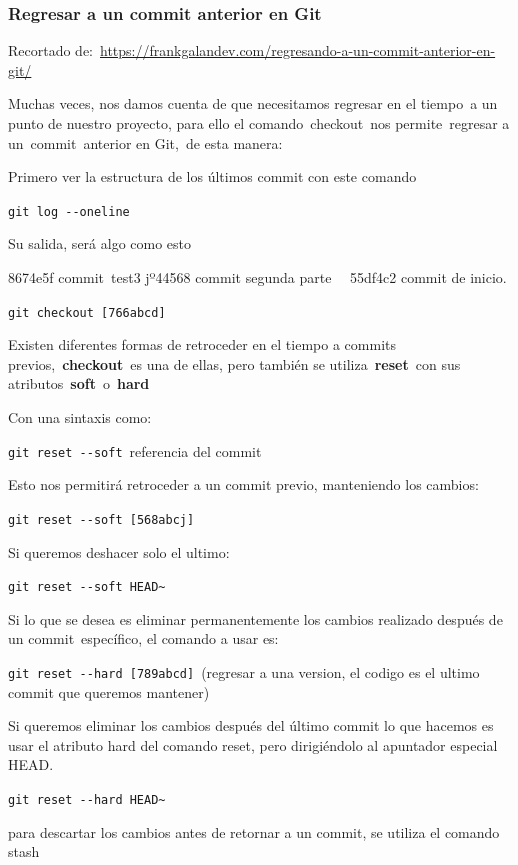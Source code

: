 \documentclass[
  a2paper,
]{article}
\begin{document}
\hypertarget{regresar-a-un-commit-anterior-en-git}{%
\subsubsection{Regresar a un commit anterior en
Git}\label{regresar-a-un-commit-anterior-en-git}}

Recortado
de:~\url{https://frankgalandev.com/regresando-a-un-commit-anterior-en-git/}

Muchas veces, nos damos cuenta de que necesitamos regresar en el
tiempo\, a un punto de nuestro proyecto, para ello el
comando~checkout~nos permite\, regresar a un~commit~anterior en Git,\,
de esta manera:

Primero ver la estructura de los últimos commit con este comando

\texttt{git\ log\ -\/-oneline}~~

Su salida, será algo como esto

8674e5f commit \,test3 jº44568 commit segunda parte~~ 55df4c2 commit de
inicio.

\texttt{git\ checkout~{[}766abcd{]}}~~

Existen diferentes formas de retroceder en el tiempo a commits
previos,~\textbf{checkout}~es una de ellas, pero también se
utiliza~\textbf{reset}~con sus atributos~\textbf{soft}~o~\textbf{hard}

Con una sintaxis como:

\texttt{git\ reset\ -\/-soft}~referencia del commit~~

Esto nos permitirá retroceder a un commit previo, manteniendo los
cambios:~~

\texttt{git\ reset\ -\/-soft~{[}568abcj{]}}~~

Si queremos deshacer solo el ultimo:~~

\texttt{git\ reset\ -\/-soft\ HEAD\textasciitilde{}}~~

Si lo que se desea es eliminar permanentemente los cambios realizado
después de un commit \,específico, el comando a usar es:~~

\texttt{git\ reset\ -\/-hard~{[}789abcd{]}}~(regresar a una version, el
codigo es el ultimo commit que queremos mantener)

Si queremos eliminar los cambios después del último commit lo que
hacemos es usar el atributo hard del comando reset, pero dirigiéndolo al
apuntador especial HEAD.

\texttt{git\ reset\ -\/-hard\ HEAD\textasciitilde{}}~~

para descartar los cambios antes de retornar a un commit, se utiliza el
comando stash
\end{document}
